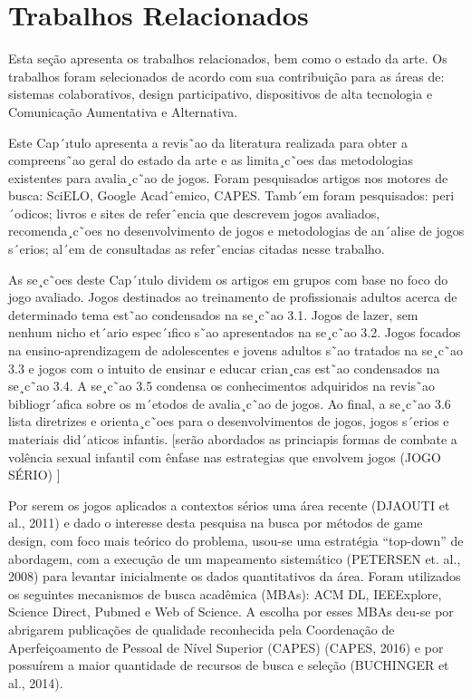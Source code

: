 \chapter{Trabalhos Relacionados}\label{ch:Relacionados}

Esta seção apresenta os trabalhos relacionados, bem como o estado da arte. Os trabalhos foram selecionados de acordo com sua contribuição para as áreas de: sistemas colaborativos, design participativo, dispositivos de alta tecnologia e Comunicação Aumentativa e Alternativa.

Este Cap´ıtulo apresenta a revis˜ao da literatura realizada para obter a compreens˜ao geral do estado da arte e as limita¸c˜oes das metodologias existentes para avalia¸c˜ao de jogos. Foram pesquisados artigos nos motores de busca: SciELO, Google Acadˆemico, CAPES. Tamb´em foram pesquisados: peri´odicos; livros e sites de referˆencia que descrevem jogos avaliados, recomenda¸c˜oes no desenvolvimento de jogos e metodologias de an´alise de jogos s´erios; al´em de consultadas as referˆencias citadas nesse trabalho. 

As se¸c˜oes deste Cap´ıtulo dividem os artigos em grupos com base no foco do jogo avaliado. Jogos destinados ao treinamento de profissionais adultos acerca de determinado tema est˜ao condensados na se¸c˜ao 3.1. Jogos de lazer, sem nenhum nicho et´ario espec´ıfico s˜ao apresentados na se¸c˜ao 3.2. Jogos focados na ensino-aprendizagem de adolescentes e jovens adultos s˜ao tratados na se¸c˜ao 3.3 e jogos com o intuito de ensinar e educar crian¸cas est˜ao condensados na se¸c˜ao 3.4. A se¸c˜ao 3.5 condensa os conhecimentos adquiridos na revis˜ao bibliogr´afica sobre os m´etodos de avalia¸c˜ao de jogos. Ao final, a se¸c˜ao 3.6 lista diretrizes e orienta¸c˜oes para o desenvolvimentos de jogos, jogos s´erios e materiais did´aticos infantis. [serão abordados as princiapis formas de combate a volência sexual infantil com ênfase nas estrategias que envolvem jogos (JOGO SÉRIO) ]

Por serem os jogos aplicados a contextos sérios uma área recente (DJAOUTI et al., 2011) e dado o interesse desta pesquisa na busca por métodos de game design, com foco mais teórico do problema, usou-se uma estratégia “top-down” de abordagem, com a execução de um mapeamento sistemático (PETERSEN et. al., 2008) para levantar inicialmente os dados quantitativos da área. Foram utilizados os seguintes mecanismos de busca acadêmica (MBAs): ACM DL, IEEExplore, Science Direct, Pubmed e Web of Science. A escolha por esses MBAs deu-se por abrigarem publicações de qualidade reconhecida pela Coordenação de Aperfeiçoamento de Pessoal de Nível Superior (CAPES) (CAPES, 2016) e por possuírem a maior quantidade de recursos de busca e seleção (BUCHINGER et al., 2014).

